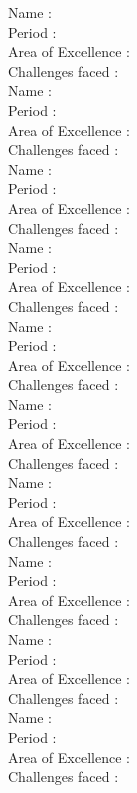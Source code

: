\documentclass[a4paper,10pt]{article}
\begin{document}
\newblock
Name : \\
Period : \\
Area of Excellence : \\
Challenges faced : \\

\newblock
Name : \\
Period : \\
Area of Excellence : \\
Challenges faced : \\

\newblock
Name : \\
Period : \\
Area of Excellence : \\
Challenges faced : \\

\newblock
Name : \\
Period : \\
Area of Excellence : \\
Challenges faced : \\

\newblock
Name : \\
Period : \\
Area of Excellence : \\
Challenges faced : \\

\newblock
Name : \\
Period : \\
Area of Excellence : \\
Challenges faced : \\

\newblock
Name : \\
Period : \\
Area of Excellence : \\
Challenges faced : \\

\newblock
Name : \\
Period : \\
Area of Excellence : \\
Challenges faced : \\

\newblock
Name : \\
Period : \\
Area of Excellence : \\
Challenges faced : \\

\newblock
Name : \\
Period : \\
Area of Excellence : \\
Challenges faced : \\
\end{document}
